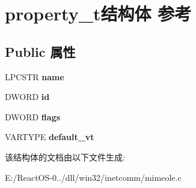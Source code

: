 \hypertarget{structproperty__t}{}\section{property\+\_\+t结构体 参考}
\label{structproperty__t}
\subsection*{Public 属性}
\begin{DoxyCompactItemize}
\item 
\mbox{\label{structproperty__t_a27b6609cc0044d7b8b47705ae2bd1501}} 
L\+P\+C\+S\+TR {\bfseries name}
\item 
\mbox{\label{structproperty__t_a57ec58dfa1691494004f52897989e996}} 
D\+W\+O\+RD {\bfseries id}
\item 
\mbox{\label{structproperty__t_a17e5549e42d63d62d5fd8a1f214ef2a1}} 
D\+W\+O\+RD {\bfseries flags}
\item 
\mbox{\label{structproperty__t_ad1948ca8b1884035bf124f14f7eedd3b}} 
V\+A\+R\+T\+Y\+PE {\bfseries default\+\_\+vt}
\end{DoxyCompactItemize}


该结构体的文档由以下文件生成\+:\begin{DoxyCompactItemize}
\item 
E\+:/\+React\+O\+S-\/0../dll/win32/inetcomm/mimeole.\+c\end{DoxyCompactItemize}
